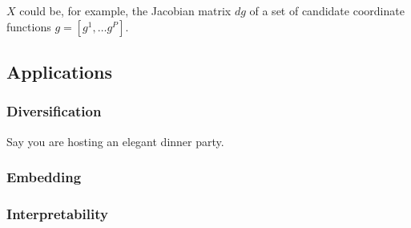 $X$ could be, for example, the Jacobian matrix $d g$ of a set of candidate coordinate functions $g = [g^1, \dotsc g^P]$.




\subsection{Applications}

\subsubsection{Diversification}

Say you are hosting an elegant dinner party.

\subsubsection{Embedding}

\subsubsection{Interpretability}





